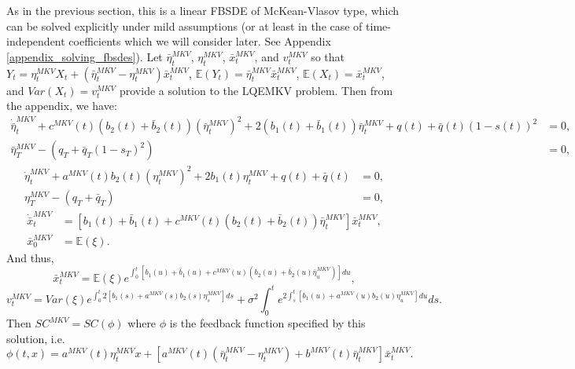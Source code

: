 \documentclass[11pt]{article}
\begin{document}
As in the previous section, this is a linear FBSDE of McKean-Vlasov type, which can be solved explicitly under mild assumptions (or at least in the case of time-independent coefficients which we will consider later. See Appendix \ref{appendix_solving_fbsdes}). Let $\bar{\eta}_t^{MKV}$, $\eta_t^{MKV}$, $\bar{x}_t^{MKV}$, and $v^{MKV}_t$ so that $Y_t=\eta_t^{MKV}X_t+(\bar{\eta}_t^{MKV}-\eta_t^{MKV})\bar{x}_t^{MKV}$, $\mathbb{E}(Y_t)=\bar{\eta}_t^{MKV}\bar{x}_t^{MKV}$, $\mathbb{E}(X_t)=\bar{x}_t^{MKV}$, and $Var(X_t)=v^{MKV}_t$ provide a solution to the LQEMKV problem. Then from the appendix, we have:
\begin{equation}
\begin{split}
\dot{\bar{\eta}}^{MKV}_t+c^{MKV}(t)(b_2(t)+\bar{b}_2(t)) (\bar{\eta}^{MKV}_t)^2+2(b_1(t)+\bar{b}_1(t)) \bar{\eta}^{MKV}_t +q(t)+\bar{q}(t)(1-s(t))^2&=0,\\
\bar{\eta}^{MKV}_T-(q_T+\bar{q}_T(1-s_T)^2)&=0,
\end{split}
\label{eq:eta_bar_MKV}
\end{equation}
\begin{equation}
\begin{split}
\dot{\eta}^{MKV}_t+a^{MKV}(t)b_2(t)(\eta^{MKV}_t)^2+2b_1(t)\eta^{MKV}_t+q(t)+\bar{q}(t)&=0, \\
\eta^{MKV}_T-(q_T+\bar{q}_T)&=0,
\end{split}
\end{equation}
\begin{equation}
\begin{split}
\dot{\bar{x}}^{MKV}_t&=\left[b_1(t)+\bar{b}_1(t)+c^{MKV}(t)(b_2(t)+\bar{b}_2(t))\bar{\eta}^{MKV}_t\right]\bar{x}^{MKV}_t, \\
\bar{x}^{MKV}_0&=\mathbb{E}(\xi).
\end{split}
\label{eq:x_bar_MKV}
\end{equation}
And thus,
\begin{equation}
\bar{x}^{MKV}_t=\mathbb{E}(\xi) e^{\int_0^t\left[b_1(u)+\bar{b}_1(u)+c^{MKV}(u)(b_2(u)+\bar{b}_2(u)\bar{\eta}^{MKV}_u)\right]du},
\end{equation}
\begin{equation}
v^{MKV}_t=Var(\xi)e^{\int_0^t 2\left[b_1(s)+a^{MKV}(s)b_2(s)\eta^{MKV}_s\right]ds}+\sigma^2 \int_0^t e^{2 \int_s^t \left[b_1(u)+a^{MKV}(u)b_2(u)\eta^{MKV}_u\right] du}ds.
\label{eq:v_t_MKV}
\end{equation}
Then $SC^{MKV}=SC(\phi)$ where $\phi$ is the feedback function specified by this solution, i.e.
\begin{equation*}
    \phi(t,x)=a^{MKV}(t)\eta_t^{MKV}x+\left[a^{MKV}(t)(\bar{\eta}_t^{MKV}-\eta_t^{MKV})+b^{MKV}(t)\bar{\eta}_t^{MKV} \right]\bar{x}_t^{MKV}.
\end{equation*}
\end{document}

